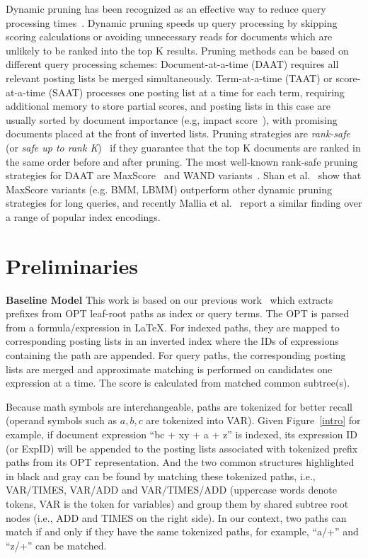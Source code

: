 \documentclass[runningheads]{llncs}
\begin{document}
Dynamic pruning has been recognized as an effective way to reduce query processing times~\cite{jonassen_simon_2011, antonio2019, macdonald2011upper, tonellotto2018efficient}.
%
Dynamic pruning speeds up query processing by skipping scoring calculations or avoiding unnecessary reads for documents which are unlikely to be ranked into the top K results.
%
Pruning methods can be based on different query processing schemes:
Document-at-a-time (DAAT) requires all relevant posting lists be merged simultaneously. Term-at-a-time (TAAT) or score-at-a-time (SAAT) processes one posting list at a time for each term, requiring additional memory to store partial scores, and posting lists in this case are usually sorted by document importance (e.g, impact score~\cite{anh2006SAAT}), with promising documents placed at  the front of inverted lists.
%
Pruning strategies are \textit{rank-safe} (or \textit{safe up to rank K})~\cite{turtle_flood_1995} if they guarantee that the top K documents are ranked in the same order before and after pruning. 
%
The most well-known rank-safe pruning strategies for DAAT are MaxScore~\cite{turtle_flood_1995, strohman_turtle_2005, jonassen_simon_2011} and WAND variants~\cite{broder2003WAND, ding2011BMW}.
%
Shan et al.~\cite{Shandongdong2012} show that MaxScore variants (e.g. BMM, LBMM) outperform other dynamic pruning strategies for long queries, and recently Mallia et al.~\cite{antonio2019} report a similar finding over a range of popular index encodings.


\section{Preliminaries}
\noindent\textbf{Baseline Model}\; This work is based on our previous work~\cite{a0_2019} which extracts prefixes from OPT leaf-root paths as index or query terms. The OPT is parsed from a formula/expression in \LaTeX{}. For indexed paths, they are mapped to corresponding posting lists in an inverted index where the IDs of expressions containing the path are appended.
For query paths, the corresponding posting lists are merged and approximate matching is performed on candidates one expression at a time. The score is calculated from matched common subtree(s).

Because math symbols are interchangeable, paths are tokenized for better recall (operand symbols such as $a, b, c$ are tokenized into VAR).
Given Figure~\ref{intro} for example, if document expression ``bc + xy + a + z'' is indexed, its expression ID (or ExpID) will be appended to the posting lists associated with tokenized prefix paths from its OPT representation.
And the two common structures highlighted in black and gray can be found by matching these tokenized paths, i.e.,  VAR/TIMES, VAR/ADD and VAR/TIMES/ADD (uppercase words denote tokens, VAR is the token for variables) and group them by shared subtree root nodes (i.e., ADD and TIMES on the right side).
%
In our context, two paths can match if and only if they have the same tokenized paths,
for example, ``a/+'' and ``z/+'' can be matched.
\end{document}
